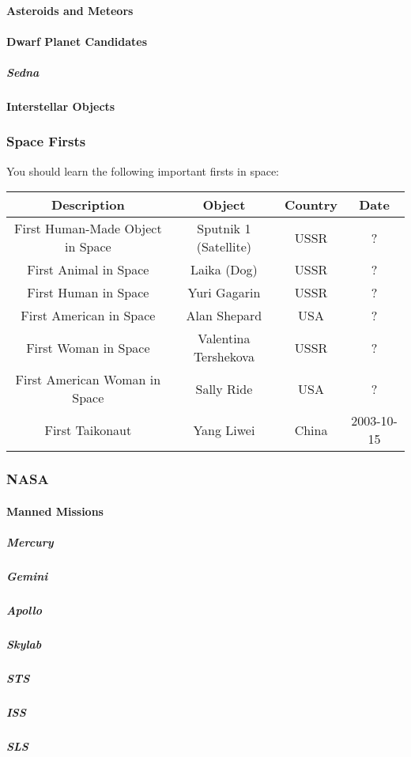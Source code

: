 				\paragraph{Asteroids and Meteors}
				\paragraph{Dwarf Planet Candidates}
					\subparagraph{Sedna}
					
				\paragraph{Interstellar Objects}
				
			\subsubsection{Space Firsts}
				You should learn the following important firsts in space:
				
			\begin{longtable}{|c|c|c|c|}
				\hline
				\textbf{Description} & {Object} & Country & Date \\
				\hline
				First Human-Made Object in Space & Sputnik 1 (Satellite) & USSR & ? \\
				\hline
				First Animal in Space & Laika (Dog) & USSR & ? \\
				\hline
				First Human in Space & Yuri Gagarin &  USSR & ? \\
				\hline
				First American in Space & Alan Shepard & USA & ? \\
				\hline
				First Woman in Space & Valentina Tershekova & USSR & ? \\
				\hline
				First American Woman in Space & Sally Ride & USA & ? \\
				\hline
				First Taikonaut & Yang Liwei & China & 2003-10-15\\
				\hline
			\end{longtable}
			
			\subsubsection{NASA}
				\paragraph{Manned Missions}
					\subparagraph{Mercury}
						
					\subparagraph{Gemini}
					\subparagraph{Apollo}
					\subparagraph{Skylab}
					\subparagraph{STS}
					\subparagraph{ISS}
					\subparagraph{SLS}
